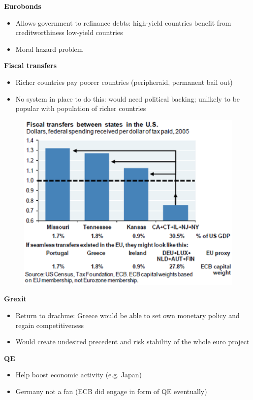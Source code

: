 \documentclass{beamer}
\begin{document}
\begin{frame}
  \textbf{Eurobonds}
  \begin{itemize}
    \item Allows government to refinance debts: high-yield countries benefit from creditworthiness low-yield countries
    \item Moral hazard problem
  \end{itemize}
  \medskip
  \textbf{Fiscal transfers}
  \begin{itemize}
    \item Richer countries pay poorer countries (peripheraid, permanent bail out)
    \item No system in place to do this: would need political backing;  unlikely to be popular with population of richer countries    
  \end{itemize}
\end{frame}

\begin{frame}
  \begin{figure}
    \includegraphics[scale=.6]{peripheraid.eps}
  \end{figure}
\end{frame}

\begin{frame}
  \textbf{Grexit}
  \begin{itemize}
    \item Return to drachme: Greece would be able to set own monetary policy and regain competitiveness    
    \item Would create undesired precedent and risk stability of the whole euro project
  \end{itemize}
  \medskip
  \textbf{QE}
  \begin{itemize}
    \item Help boost economic activity (e.g. Japan)
    \item Germany not a fan (ECB did engage in form of QE eventually)    
  \end{itemize}
\end{frame}
\end{document}

